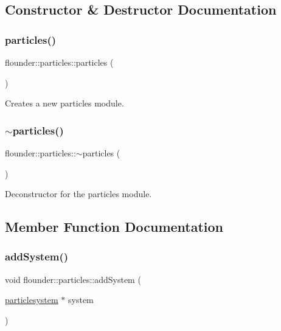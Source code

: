 \subsection{Constructor \& Destructor Documentation}
\mbox{\label{classflounder_1_1particles_a252873bd7c1d03da7cfc09a7ff96e178}} 
\subsubsection{\texorpdfstring{particles()}{particles()}}
{\footnotesize\ttfamily flounder\+::particles\+::particles (\begin{DoxyParamCaption}{ }\end{DoxyParamCaption})}



Creates a new particles module. 

\mbox{\label{classflounder_1_1particles_a49776c1089c2291ee8144c0d4ef5ff59}} 
\subsubsection{\texorpdfstring{$\sim$particles()}{~particles()}}
{\footnotesize\ttfamily flounder\+::particles\+::$\sim$particles (\begin{DoxyParamCaption}{ }\end{DoxyParamCaption})}



Deconstructor for the particles module. 



\subsection{Member Function Documentation}
\mbox{\label{classflounder_1_1particles_a39a6e05f1323ebf326930ef2e9b72a3e}} 
\subsubsection{\texorpdfstring{add\+System()}{addSystem()}}
{\footnotesize\ttfamily void flounder\+::particles\+::add\+System (\begin{DoxyParamCaption}\item[{\hyperlink{classflounder_1_1particlesystem}{particlesystem} $\ast$}]{system }\end{DoxyParamCaption})}



